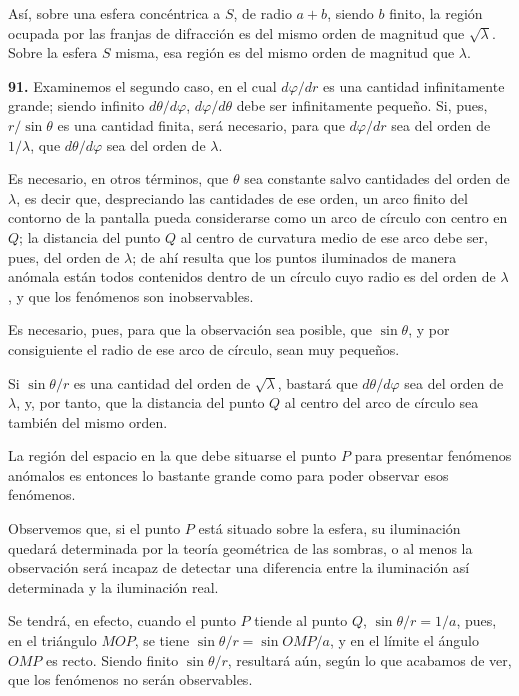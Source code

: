 Así, sobre una esfera concéntrica a $S$, de radio $a+b$, siendo $b$
finito, la región ocupada por las franjas de difracción es del mismo
orden de magnitud que $\sqrt{\lambda}$. Sobre la esfera $S$ misma, esa
región es del mismo orden de magnitud que $\lambda$.

\noindent\textbf{91.} Examinemos el segundo caso, en el cual $d\varphi/dr$
es una cantidad infinitamente grande; siendo infinito $d\theta/d\varphi$,
$d\varphi/d\theta$ debe ser infinitamente pequeño. Si, pues, $r/\sin\theta$
es una cantidad finita, será necesario, para que $d\varphi/dr$ sea del
orden de $1/\lambda$, que $d\theta/d\varphi$ sea del orden de $\lambda$.

Es necesario, en otros términos, que $\theta$ sea constante salvo
cantidades del orden de $\lambda$, es decir que, despreciando las
cantidades de ese orden, un arco finito del contorno de la pantalla pueda
considerarse como un arco de círculo con centro en $Q$; la distancia del
punto $Q$ al centro de curvatura medio de ese arco debe ser, pues, del
orden de $\lambda$; de ahí resulta que los puntos iluminados de manera
anómala están todos contenidos dentro de un círculo cuyo radio es del
orden de $\lambda$, y que los fenómenos son inobservables.

Es necesario, pues, para que la observación sea posible, que $\sin\theta$,
y por consiguiente el radio de ese arco de círculo, sean muy pequeños.

Si $\sin\theta/r$ es una cantidad del orden de $\sqrt{\lambda}$, bastará
que $d\theta/d\varphi$ sea del orden de $\lambda$, y, por tanto, que la
distancia del punto $Q$ al centro del arco de círculo sea también del
mismo orden.

La región del espacio en la que debe situarse el punto $P$ para presentar
fenómenos anómalos es entonces lo bastante grande como para poder
observar esos fenómenos.

Observemos que, si el punto $P$ está situado sobre la esfera, su
iluminación quedará determinada por la teoría geométrica de las sombras,
o al menos la observación será incapaz de detectar una diferencia entre
la iluminación así determinada y la iluminación real.

Se tendrá, en efecto, cuando el punto $P$ tiende al punto $Q$,
$\sin\theta/r=1/a$, pues, en el triángulo $MOP$, se tiene
$\sin\theta/r=\sin OMP/a$, y en el límite el ángulo $OMP$ es recto. Siendo
finito $\sin\theta/r$, resultará aún, según lo que acabamos de ver, que
los fenómenos no serán observables.

